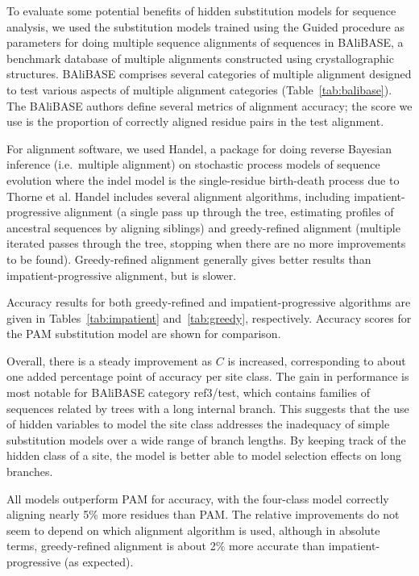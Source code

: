 \documentclass[12pt]{article}
\begin{document}
To evaluate some potential benefits of hidden substitution models for sequence analysis, we used the
substitution models trained using the Guided procedure as parameters for doing multiple sequence
alignments of sequences in BAliBASE, a benchmark database of multiple alignments constructed using
crystallographic structures.\cite{Thompson1999} BAliBASE comprises several categories of multiple
alignment designed to test various aspects of multiple alignment categories (Table~\ref{tab:balibase}).
The BAliBASE authors define several metrics of alignment accuracy; the score we use is the proportion
of correctly aligned residue pairs in the test alignment.

For alignment software, we used Handel,\cite{Holmes2001} a package for doing reverse Bayesian
inference (i.e.\ multiple alignment) on stochastic process models of sequence evolution where the
indel model is the single-residue birth-death process due to Thorne et al.\cite{Thorne1991} Handel
includes several alignment algorithms, including impatient-progressive alignment (a single pass up
through the tree, estimating profiles of ancestral sequences by aligning siblings) and greedy-refined
alignment (multiple iterated passes through the tree, stopping when there are no more improvements
to be found). Greedy-refined alignment generally gives better results than impatient-progressive
alignment, but is slower.

Accuracy results for both greedy-refined and impatient-progressive algorithms are given in
Tables~\ref{tab:impatient} and~\ref{tab:greedy}, respectively. Accuracy scores for the PAM
substitution model are shown for comparison.

Overall, there is a steady improvement as $C$ is increased, corresponding to about one added
percentage point of accuracy per site class. The gain in performance is most notable for BAliBASE
category ref3/test, which contains families of sequences related by trees with a long internal
branch. This suggests that the use of hidden variables to model the site class addresses the
inadequacy of simple substitution models over a wide range of branch lengths. By keeping track of the
hidden class of a site, the model is better able to model selection effects on long branches.

All models outperform PAM for accuracy, with the four-class model correctly aligning nearly 5\% more
residues than PAM. The relative improvements do not seem to depend on which alignment algorithm is
used, although in absolute terms, greedy-refined alignment is about 2\% more accurate than
impatient-progressive (as expected).
\end{document}
